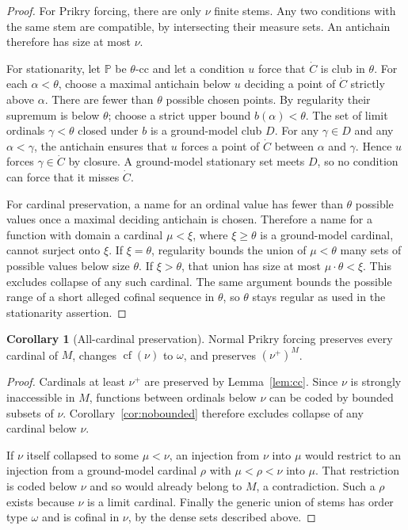 \documentclass[11pt,letterpaper]{article}
\theoremstyle{definition}
\newtheorem{corollary}[definition]{Corollary}
\numberwithin{equation}{section}
\newcommand{\cf}{\operatorname{cf}}
\newcommand{\PP}{\mathbb P}
\begin{document}
\begin{proof}
For Prikry forcing, there are only $\nu$ finite stems. Any two
conditions with the same stem are compatible, by intersecting their
measure sets. An antichain therefore has size at most $\nu$.

For stationarity, let $\PP$ be $\theta$-cc and let a condition $u$
force that $\dot C$ is club in $\theta$. For each $\alpha<\theta$,
choose a maximal antichain below $u$ deciding a point of $\dot C$
strictly above $\alpha$. There are fewer than $\theta$ possible
chosen points. By regularity their supremum is below $\theta$;
choose a strict upper bound $b(\alpha)<\theta$.
The set of limit ordinals $\gamma<\theta$ closed under $b$ is a
ground-model club $D$. For any $\gamma\in D$ and any $\alpha<\gamma$,
the antichain ensures that $u$ forces a point of $\dot C$ between
$\alpha$ and $\gamma$. Hence $u$ forces $\gamma\in\dot C$ by
closure. A ground-model stationary set meets $D$, so no condition
can force that it misses $\dot C$.

For cardinal preservation, a name for an ordinal value has fewer
than $\theta$ possible values once a maximal deciding antichain is
chosen. Therefore a name for a function with domain a cardinal
$\mu<\xi$, where $\xi\ge\theta$ is a ground-model cardinal, cannot
surject onto $\xi$. If $\xi=\theta$, regularity bounds the union of
$\mu<\theta$ many sets of possible values below size $\theta$.
If $\xi>\theta$, that union has size at most
$\mu\cdot\theta<\xi$. This excludes collapse of any such cardinal.
The same argument bounds the possible range of a short alleged
cofinal sequence in $\theta$, so $\theta$ stays regular as used in
the stationarity assertion.
\end{proof}

\begin{corollary}[All-cardinal preservation]\label{cor:cardinalpres}
Normal Prikry forcing preserves every cardinal of $M$, changes
$\cf(\nu)$ to $\omega$, and preserves $(\nu^+)^M$.
\end{corollary}

\begin{proof}
Cardinals at least $\nu^+$ are preserved by Lemma~\ref{lem:cc}.
Since $\nu$ is strongly inaccessible in $M$, functions between
ordinals below $\nu$ can be coded by bounded subsets of $\nu$.
Corollary~\ref{cor:nobounded} therefore excludes collapse of any
cardinal below $\nu$.

If $\nu$ itself collapsed to some $\mu<\nu$, an injection from $\nu$
into $\mu$ would restrict to an injection from a ground-model
cardinal $\rho$ with $\mu<\rho<\nu$ into $\mu$. That restriction is
coded below $\nu$ and so would already belong to $M$, a
contradiction. Such a $\rho$ exists because $\nu$ is a limit cardinal.
Finally the generic union of stems has order type $\omega$ and is
cofinal in $\nu$, by the dense sets described above.
\end{proof}
\end{document}
